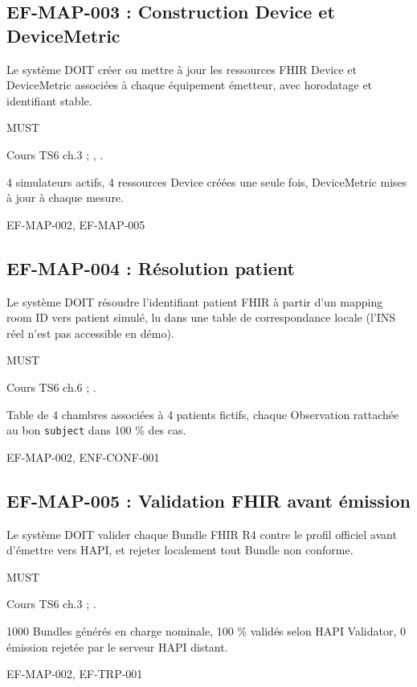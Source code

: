 \subsection*{EF-MAP-003 : Construction Device et DeviceMetric}
\begin{description}[leftmargin=2.5cm, style=nextline]
  \item[Énoncé] Le système DOIT créer ou mettre à jour les ressources FHIR Device et DeviceMetric associées à chaque équipement émetteur, avec horodatage et identifiant stable.
  \item[Priorité] MUST
  \item[Source] Cours TS6 ch.3 ; \cite{hl7_fhir_r4}, \cite{ihe_pcd_tf}.
  \item[Recette] 4 simulateurs actifs, 4 ressources Device créées une seule fois, DeviceMetric mises à jour à chaque mesure.
  \item[Lié à] EF-MAP-002, EF-MAP-005
\end{description}

\subsection*{EF-MAP-004 : Résolution patient}
\begin{description}[leftmargin=2.5cm, style=nextline]
  \item[Énoncé] Le système DOIT résoudre l'identifiant patient FHIR à partir d'un mapping room ID vers patient simulé, lu dans une table de correspondance locale (l'INS réel n'est pas accessible en démo).
  \item[Priorité] MUST
  \item[Source] Cours TS6 ch.6 ; \cite{ihe_pcd_tf}.
  \item[Recette] Table de 4 chambres associées à 4 patients fictifs, chaque Observation rattachée au bon \texttt{subject} dans 100 \% des cas.
  \item[Lié à] EF-MAP-002, ENF-CONF-001
\end{description}

\subsection*{EF-MAP-005 : Validation FHIR avant émission}
\begin{description}[leftmargin=2.5cm, style=nextline]
  \item[Énoncé] Le système DOIT valider chaque Bundle FHIR R4 contre le profil officiel avant d'émettre vers HAPI, et rejeter localement tout Bundle non conforme.
  \item[Priorité] MUST
  \item[Source] Cours TS6 ch.3 ; \cite{hl7_fhir_r4}.
  \item[Recette] 1000 Bundles générés en charge nominale, 100 \% validés selon HAPI Validator, 0 émission rejetée par le serveur HAPI distant.
  \item[Lié à] EF-MAP-002, EF-TRP-001
\end{description}

